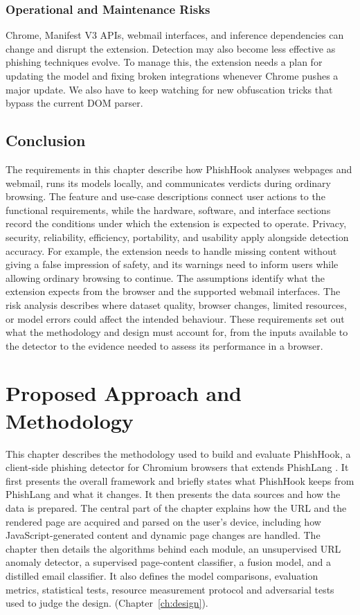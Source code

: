 \documentclass{FastFyp}
\begin{document}
\subsection{Operational and Maintenance Risks}
Chrome, Manifest V3 APIs, webmail interfaces, and inference dependencies can change and disrupt the extension. Detection may also become less effective as phishing techniques evolve. To manage this, the extension needs a plan for updating the model and fixing broken integrations whenever Chrome pushes a major update. We also have to keep watching for new obfuscation tricks that bypass the current DOM parser.

\section{Conclusion}
The requirements in this chapter describe how PhishHook analyses webpages and webmail, runs its models locally, and communicates verdicts during ordinary browsing. The feature and use-case descriptions connect user actions to the functional requirements, while the hardware, software, and interface sections record the conditions under which the extension is expected to operate. Privacy, security, reliability, efficiency, portability, and usability apply alongside detection accuracy. For example, the extension needs to handle missing content without giving a false impression of safety, and its warnings need to inform users while allowing ordinary browsing to continue. The assumptions identify what the extension expects from the browser and the supported webmail interfaces. The risk analysis describes where dataset quality, browser changes, limited resources, or model errors could affect the intended behaviour. These requirements set out what the methodology and design must account for, from the inputs available to the detector to the evidence needed to assess its performance in a browser.

\chapter{Proposed Approach and Methodology}
\label{ch:methodology}

This chapter describes the methodology used to build and evaluate PhishHook, a client-side phishing detector for Chromium browsers that extends PhishLang \cite{phishlang2026}. It first presents the overall framework and briefly states what PhishHook keeps from PhishLang and what it changes. It then presents the data sources and how the data is prepared. The central part of the chapter explains how the URL and the rendered page are acquired and parsed on the user's device, including how JavaScript-generated content and dynamic page changes are handled. The chapter then details the algorithms behind each module, an unsupervised URL anomaly detector, a supervised page-content classifier, a fusion model, and a distilled email classifier. It also defines the model comparisons, evaluation metrics, statistical tests, resource measurement protocol and adversarial tests used to judge the design. (Chapter~\ref{ch:design}).
\end{document}
